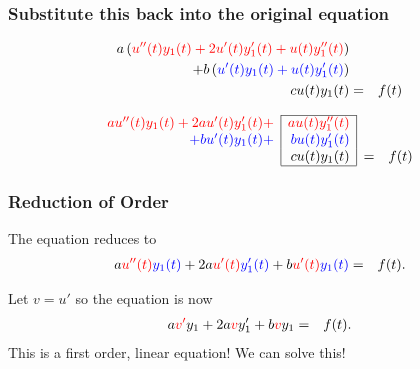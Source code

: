 \begin{frame}
  \frametitle{Substitute this back into the original equation}

  \begin{eqnarray*}
    a \left( {\color{red}u''(t) y_1(t) + 2 u'(t) y_1'(t) + u(t) y_1''(t)} \right) & & \\
    + b \left( {\color{blue}u'(t) y_1(t) + u(t) y_1'(t)} \right) & & \\
    c u(t) y_1(t) & = & f(t)
  \end{eqnarray*}

  \begin{eqnarray*}
    \begin{array}{r|r|cl}
      \cline{2-2}
      \redText{ a u''(t) y_1(t) + 2 a u'(t) y_1'(t) +} & \redText{a u(t) y_1''(t)} & & \\
      \blueText{+ b u'(t) y_1(t) + } & \blueText{b u(t) y_1'(t)} & & \\
      & c u(t) y_1(t) & = & f(t) \\ \cline{2-2}
    \end{array}
  \end{eqnarray*}

\end{frame}


\begin{frame}
  \frametitle{Reduction of Order}

  The equation reduces to
  \begin{eqnarray*}
    a {\color{red}u''(t)} {\color{blue}y_1(t)} + 2 a {\color{red}u'(t)} {\color{blue}y_1'(t)} + b {\color{red}u'(t)} {\color{blue}y_1(t)} & = & f(t).
  \end{eqnarray*}

  Let $v=u'$ so the equation is now
  \begin{eqnarray*}
    a {\color{red}v'} y_1 + 2 a {\color{red}v} y_1' + b {\color{red}v} y_1 & = & f(t).
  \end{eqnarray*}
  This is a first order, linear equation! We can solve this!


\end{frame}


